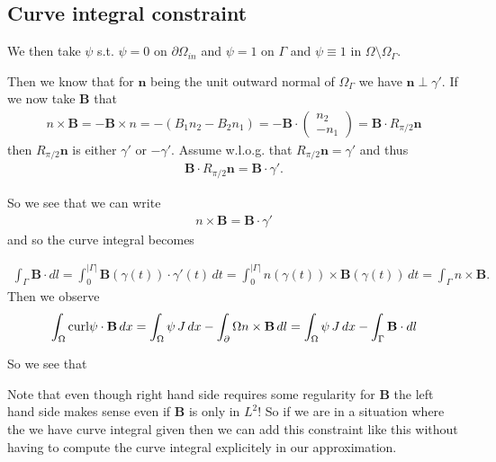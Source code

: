 \documentclass[../master_thesis.tex]{subfiles}
\begin{document}
\subsection{Curve integral constraint}


We then take $\psi$ s.t. $\psi = 0$ on $\partial \Omega_{in}$ 
and $\psi = 1$ on $\Gamma$ and $\psi \equiv 1$ in $\Omega \setminus \Omega_\Gamma$.

Then we know that for $\mathbf{n}$ being the unit outward normal 
of $\Omega_\Gamma$ we have $\mathbf{n} \perp \gamma'$.
If we now take $\mathbf{B}$ that 
\begin{align*}
    n \times \mathbf{B} =   -\mathbf{B}\times n 
    = - (B_1 n_2 - B_2 n_1) = - \mathbf{B} \cdot \begin{pmatrix}n_2 \\ -n_1 \end{pmatrix}
    = \mathbf{B} \cdot R_{\pi/2}\mathbf{n}
\end{align*}
then $R_{\pi/2} \mathbf{n}$ is either $\gamma'$ or $-\gamma'$. Assume w.l.o.g.
that $R_{\pi/2} \mathbf{n} = \gamma'$ and thus 
\begin{align*}
    \mathbf{B} \cdot R_{\pi/2} \mathbf{n} = \mathbf{B} \cdot \gamma'.
\end{align*}

So we see that we can write 
\begin{align*}
    n \times \mathbf{B} = \mathbf{B} \cdot \gamma'
\end{align*}
and so the curve integral becomes

\begin{align*}
    \int_\Gamma \mathbf{B}\cdot dl= \int_0^{|\Gamma|} \mathbf{B}(\gamma(t)) \cdot \gamma'(t) \, dt 
    = \int_0^{|\Gamma|} n(\gamma(t)) \times \mathbf{B}(\gamma(t)) \, dt 
    = \int_\Gamma n \times \mathbf{B}.
\end{align*}
Then we observe 
\begin{align*}
    \int_\Omega \mathbf{\operatorname{curl}} \psi \cdot \mathbf{B} \, dx = 
    \int_\Omega \psi \, J \, dx - \int_\partial\Omega n\times \mathbf{B} \, dl
    = \int_\Omega \psi \, J \, dx - \int_\Gamma \mathbf{B}\cdot dl
\end{align*}

So we see that 

Note that even though right hand side requires some regularity for $\mathbf{B}$
the left hand side makes sense even if $\mathbf{B}$ is only in $L^2$!
So if we are in a situation where the we have curve integral given then 
we can add this constraint like this without having to compute the 
curve integral explicitely in our approximation.
\end{document}
